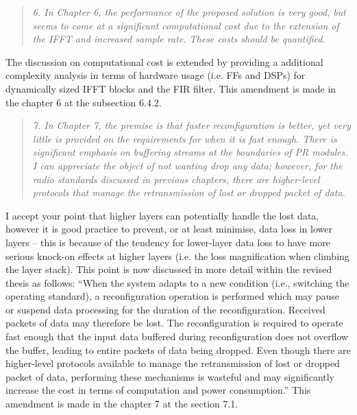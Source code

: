 \documentclass{article}
\begin{document}
\begin{quote}
\emph{6. In Chapter 6, the performance of the proposed solution is very good, but seems to come at a significant computational cost due to the extension of the IFFT and increased sample rate. These costs should be quantified.}
\end{quote}
The discussion on computational cost is extended by providing a additional complexity analysis in terms of hardware usage (i.e. FFs and DSPs) for dynamically sized IFFT blocks and the FIR filter. This amendment is made in the chapter 6 at the subsection 6.4.2.

\begin{quote}
\emph{7. In Chapter 7, the premise is that faster reconfiguration is better, yet very little is provided on the requirements for when it is fast enough. There is significant emphasis on buffering streams at the boundaries of PR modules. I can appreciate the object of not wanting drop any data; however, for the radio standards discussed in previous chapters, there are higher-level protocols that manage the retransmission of lost or dropped packet of data.}
\end{quote}
I accept your point that higher layers can potentially handle the lost data, however it is good practice to prevent, or at least minimise, data loss in lower layers -- this is because of the tendency for lower-layer data loss to have more serious knock-on effects at higher layers (i.e. the  loss magnification when climbing the layer stack). This point is now discussed in more detail within the revised thesis as follows:
``When the system adapts to a new condition (i.e., switching the operating standard), a reconfiguration operation is performed which may pause or suspend data processing for the duration of the reconfiguration. Received packets of data may therefore be lost.
The reconfiguration is required to operate fast enough that the input data buffered during reconfiguration does not overflow the buffer, leading to entire packets of data being dropped. Even though there are higher-level protocols available to manage the retransmission of lost or dropped packet of data, performing these mechanisms is wasteful and may significantly increase the cost in terms of computation and power consumption.''
This amendment is made in the chapter 7 at the section 7.1.
\end{document}

